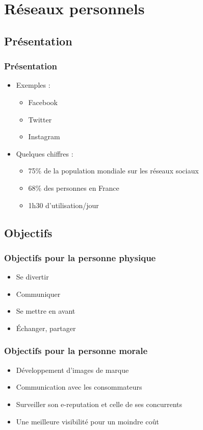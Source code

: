     \section{Réseaux personnels}

\subsection{Présentation}
\begin{frame}
\frametitle{Présentation}
\begin{itemize}
    \itemsep1em
    \item Exemples :
        \begin{itemize}
            \itemsep0.4em
            \item Facebook
            \item Twitter
            \item Instagram
        \end{itemize}
    \item Quelques chiffres :\\[0.1em]
        \begin{itemize}
            \itemsep0.4em
            \item 75\% de la population mondiale sur les réseaux sociaux %
            \item 68\% des personnes en France
            \item 1h30 d'utilisation/jour
        \end{itemize}
\end{itemize}
\end{frame}

\subsection{Objectifs}
\begin{frame}
\frametitle{Objectifs pour la personne physique}
\begin{itemize}
    \itemsep1.5em
    \item Se divertir
    \item Communiquer
    \item Se mettre en avant
    \item Échanger, partager
\end{itemize}
\end{frame}

\begin{frame}
\frametitle{Objectifs pour la personne morale}
\begin{itemize}
    \itemsep1.5em
    \item Développement d'images de marque
    \item Communication avec les consommateurs
    \item Surveiller son e-reputation et celle de ses concurrents
    \item Une meilleure visibilité pour un moindre coût
\end{itemize}
\end{frame}

